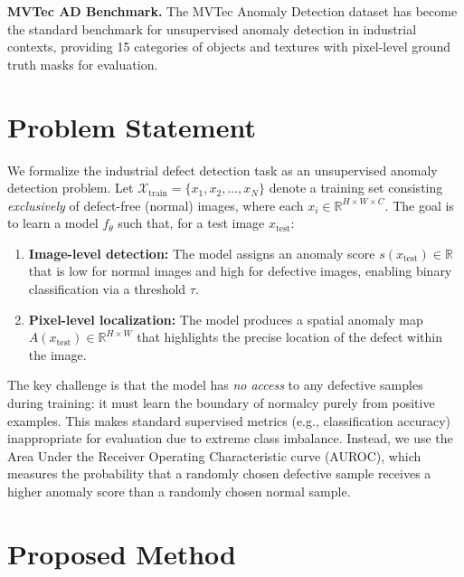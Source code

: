 \documentclass{article}
\begin{document}
\textbf{MVTec AD Benchmark.} The MVTec Anomaly Detection dataset \citep{bergmann2019mvtec} has become the standard benchmark for unsupervised anomaly detection in industrial contexts, providing 15 categories of objects and textures with pixel-level ground truth masks for evaluation.

\section{Problem Statement}

We formalize the industrial defect detection task as an unsupervised anomaly detection problem. Let $\mathcal{X}_\text{train} = \{x_1, x_2, \ldots, x_N\}$ denote a training set consisting \emph{exclusively} of defect-free (normal) images, where each $x_i \in \mathbb{R}^{H \times W \times C}$. The goal is to learn a model $f_\theta$ such that, for a test image $x_\text{test}$:

\begin{enumerate}
    \item \textbf{Image-level detection:} The model assigns an anomaly score $s(x_\text{test}) \in \mathbb{R}$ that is low for normal images and high for defective images, enabling binary classification via a threshold $\tau$.
    \item \textbf{Pixel-level localization:} The model produces a spatial anomaly map $A(x_\text{test}) \in \mathbb{R}^{H \times W}$ that highlights the precise location of the defect within the image.
\end{enumerate}

The key challenge is that the model has \emph{no access} to any defective samples during training: it must learn the boundary of normalcy purely from positive examples. This makes standard supervised metrics (e.g., classification accuracy) inappropriate for evaluation due to extreme class imbalance. Instead, we use the Area Under the Receiver Operating Characteristic curve (AUROC), which measures the probability that a randomly chosen defective sample receives a higher anomaly score than a randomly chosen normal sample.

\section{Proposed Method}
\end{document}
